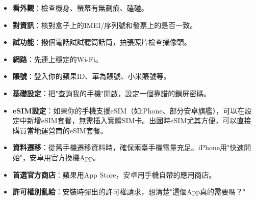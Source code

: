 

\begin{itemize}
  \item \textbf{看外觀}：檢查機身、螢幕有無劃痕、磕碰。
  \item \textbf{對資訊}：核對盒子上的IMEI/序列號和發票上的是否一致。
  \item \textbf{試功能}：撥個電話試試聽筒話筒，拍張照片檢查攝像頭。
\end{itemize}


\begin{itemize}
  \item \textbf{網路}：先連上穩定的Wi-Fi。
  \item \textbf{賬號}：登入你的蘋果ID、華為賬號、小米賬號等。
  \item \textbf{基礎設定}：把"查詢我的手機"開啟，設定一個靠譜的鎖屏密碼。
  \item \textbf{eSIM設定}：如果你的手機支援eSIM（如iPhone、部分安卓旗艦），可以在設定中新增eSIM套餐，無需插入實體SIM卡。出國時eSIM尤其方便，可以直接購買當地運營商的eSIM套餐。
  \item \textbf{資料遷移}：從舊手機遷移資料時，確保兩臺手機電量充足。iPhone用"快速開始"，安卓用官方換機App。
\end{itemize}


\begin{itemize}
  \item \textbf{首選官方商店}：蘋果用App Store，安卓用手機自帶的應用商店。
  \item \textbf{許可權別亂給}：安裝時彈出的許可權請求，想清楚"這個App真的需要嗎？"
\end{itemize}
